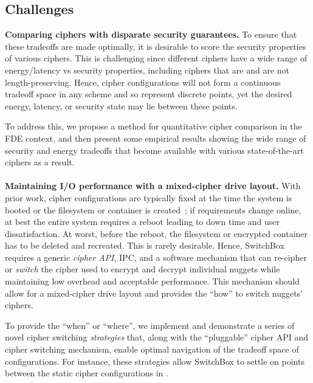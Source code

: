 
\subsection{Challenges}

\textbf{Comparing ciphers with disparate security guarantees.} To ensure that
these tradeoffs are made optimally, it is desirable to score the security
properties of various ciphers. This is challenging since different ciphers have
a wide range of energy/latency vs security properties, including ciphers that
are and are not length-preserving. Hence, cipher configurations will not form a
continuous tradeoff space in any scheme and so represent discrete points, yet
the desired energy, latency, or security state may lie between these points.

To address this, we propose a method for quantitative cipher comparison in the
FDE context, and then present some empirical results showing the wide range of
security and energy tradeoffs that become available with various
state-of-the-art ciphers as a result.\\
\\
\textbf{Maintaining I/O performance with a mixed-cipher drive layout.} With
prior work, cipher configurations are typically fixed at the time the system is
booted or the filesystem or container is created~\cite{CiteAllTheFilesystems};
if requirements change online, at best the entire system requires a reboot leading to down time and user dissatisfaction. 
At worst, before the reboot, the filesystem or encrypted
container has to be deleted and recreated. This is rarely desirable. Hence,
SwitchBox requires a generic \emph{cipher API}, IPC, and a software mechanism
that can re-cipher or \emph{switch} the cipher used to encrypt and decrypt
individual nuggets while maintaining low overhead and acceptable performance.
This mechanism should allow for a mixed-cipher drive layout and provides the
``how'' to switch nuggets' ciphers.

To provide the ``when'' or ``where'', we implement and demonstrate a series of
novel cipher switching \textit{strategies} that, along with the ``pluggable''
cipher API and cipher switching mechanism, enable optimal navigation of the
tradeoff space of configurations. For instance, these strategies allow SwitchBox
to settle on points between the static cipher configurations in
.

